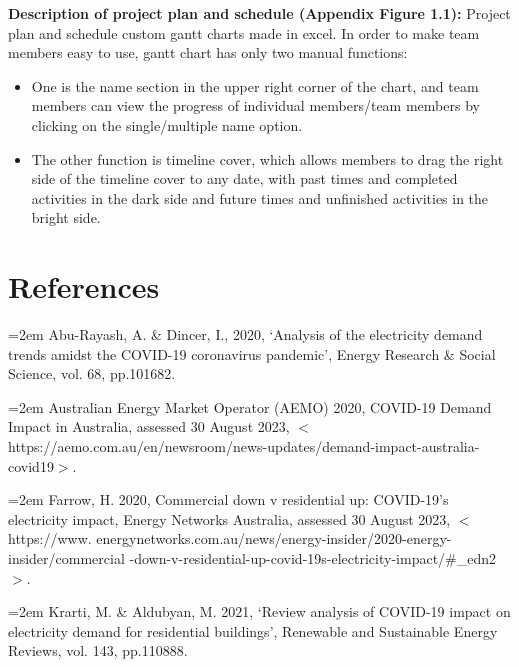 \documentclass[mstat,12pt]{unswthesis}
\begin{document}
\bigskip

\textbf{Description of project plan and schedule (Appendix Figure 1.1):}
Project plan and schedule custom gantt charts made in excel. In order to make team members easy to use, gantt chart has only two manual functions: 
\begin{itemize}
    \item One is the name section in the upper right corner of the chart, and team members can view the progress of individual members/team members by clicking on the single/multiple name option. \item The other function is timeline cover, which allows members to drag the right side of the timeline cover to any date, with past times and completed activities in the dark side and future times and unfinished activities in the bright side.	
\end{itemize}
	
\bigskip

\hypertarget{references}{%
\chapter*{References}\label{references}}




\hypertarget{refs}{}

\leavevmode{}%
\hangindent=2em
Abu-Rayash, A. \& Dincer, I., 2020, ‘Analysis of the electricity demand trends amidst the COVID-19 coronavirus pandemic’, Energy Research \& Social Science, vol. 68, pp.101682. \hfill\break

\hangindent=2em
\noindent Australian Energy Market Operator (AEMO) 2020, COVID-19 Demand Impact in Australia, assessed 30 August 2023, $<$https://aemo.com.au/en/newsroom/news-updates/demand-impact-australia-covid19$>$. \hfill\break

\hangindent=2em
\noindent Farrow, H. 2020, Commercial down v residential up: COVID-19’s electricity impact, Energy Networks Australia, assessed 30 August 2023, $<$https://www. energynetworks.com.au/news/energy-insider/2020-energy-insider/commercial -down-v-residential-up-covid-19s-electricity-impact/\#\_edn2$>$. \hfill\break

\hangindent=2em
\noindent Krarti, M. \& Aldubyan, M. 2021, ‘Review analysis of COVID-19 impact on electricity demand for residential buildings’, Renewable and Sustainable Energy Reviews, vol. 143, pp.110888. \hfill\break
\end{document}
